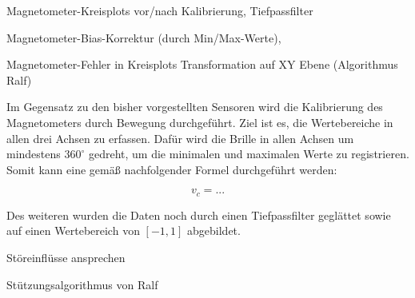 
Magnetometer-Kreisplots vor/nach Kalibrierung, 
Tiefpassfilter

Magnetometer-Bias-Korrektur (durch Min/Max-Werte), 

Magnetometer-Fehler in Kreisplots
Transformation auf XY Ebene (Algorithmus Ralf)

Im Gegensatz zu den bisher vorgestellten Sensoren wird die Kalibrierung des Magnetometers durch Bewegung durchgeführt.
Ziel ist es, die Wertebereiche in allen drei Achsen zu erfassen.
Dafür wird die Brille in allen Achsen um mindestens $360^\circ$ gedreht, um die minimalen und maximalen Werte zu registrieren. 
Somit kann eine gemäß nachfolgender Formel durchgeführt werden:

\begin{equation}
    v_c = ...
\end{equation}

Des weiteren wurden die Daten noch durch einen Tiefpassfilter geglättet sowie auf einen Wertebereich von $[-1,1]$ abgebildet.

Störeinflüsse ansprechen

Stützungsalgorithmus von Ralf